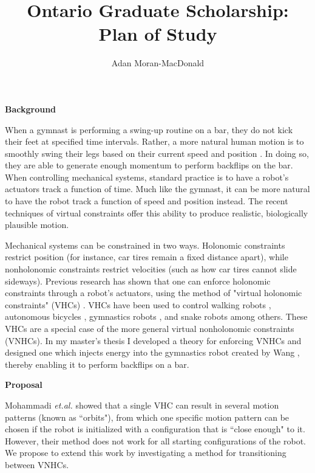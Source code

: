 \documentclass[a4paper,12pt]{article}
\begin{document}
\title{Ontario Graduate Scholarship: Plan of Study}
\author{Adan Moran-MacDonald}
\date{}
\maketitle

\begin{large}
\textbf{Background}
\end{large}

When a gymnast is performing a swing-up routine on a bar, they do not kick their
feet at specified time intervals. Rather, a more natural human motion is to
smoothly swing their legs based on their current speed and position
\cite{pendulum_length_giant_gymnastics}. In doing so, they are able to generate
enough momentum to perform backflips on the bar. When controlling mechanical
systems, standard practice is to have a robot's actuators track a function of
time. Much like the gymnast, it can be more natural to have the robot track a
function of speed and position instead. The recent techniques of virtual
constraints offer this ability to produce realistic, biologically plausible
motion.

Mechanical systems can be constrained in two ways. Holonomic constraints
restrict position (for instance, car tires remain a fixed distance apart), while
nonholonomic constraints restrict velocities (such as how car tires cannot
slide sideways). Previous research has shown that one can enforce holonomic
constraints through a robot's actuators, using the method of "virtual holonomic
constraints" (VHCs) \cite{vhcs_for_el_systems}. VHCs have been used to control
walking robots \cite{stable-walking}, autonomous bicycles \cite{bicycle},
gymnastics robots \cite{xingbo-thesis}, and snake robots \cite{snake-robot}
among others. These VHCs are a special case of the more general virtual
nonholonomic constraints (VNHCs). In my master's thesis \cite{my-thesis} I
developed a theory for enforcing VNHCs and designed one which injects energy
into the gymnastics robot created by Wang \cite{xingbo-thesis}, thereby enabling
it to perform backflips on a bar.

\begin{large} \textbf{Proposal} \end{large}

Mohammadi \textit{et.al.} \cite{manfredi-orbit-stabilization} showed that a
single VHC can result in several motion patterns (known as ``orbits"), from
which one specific motion pattern can be chosen if the robot is initialized with a
configuration that is ``close enough" to it. However, their method does not
work for all starting configurations of the robot. We propose to extend this
work by investigating a method for transitioning between VNHCs.
\end{document}
